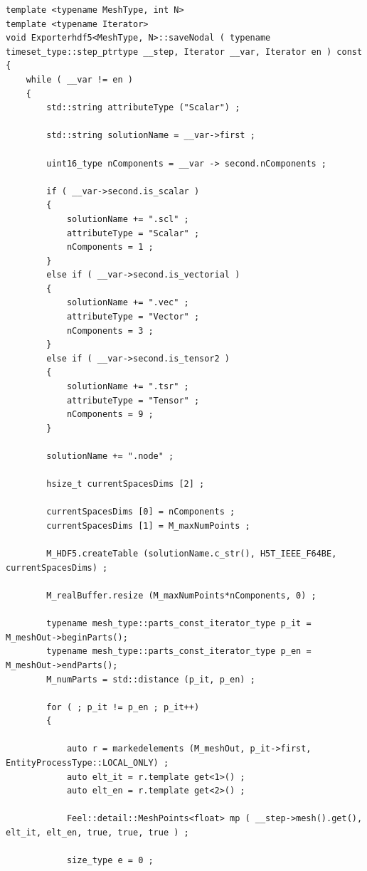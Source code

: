 \documentclass[12pt]{article}
\begin{document}
\begin{lstlisting}
template <typename MeshType, int N>
template <typename Iterator>
void Exporterhdf5<MeshType, N>::saveNodal ( typename timeset_type::step_ptrtype __step, Iterator __var, Iterator en ) const 
{   
    while ( __var != en )
    {    
        std::string attributeType ("Scalar") ;

        std::string solutionName = __var->first ;

        uint16_type nComponents = __var -> second.nComponents ;

        if ( __var->second.is_scalar )
        {
            solutionName += ".scl" ; 
            attributeType = "Scalar" ;
            nComponents = 1 ;
        }
        else if ( __var->second.is_vectorial )
        {
            solutionName += ".vec" ;
            attributeType = "Vector" ;
            nComponents = 3 ;
        }
        else if ( __var->second.is_tensor2 )
        {
            solutionName += ".tsr" ;
            attributeType = "Tensor" ;
            nComponents = 9 ;
        }

        solutionName += ".node" ;

        hsize_t currentSpacesDims [2] ;

        currentSpacesDims [0] = nComponents ;
        currentSpacesDims [1] = M_maxNumPoints ;

        M_HDF5.createTable (solutionName.c_str(), H5T_IEEE_F64BE, currentSpacesDims) ;

        M_realBuffer.resize (M_maxNumPoints*nComponents, 0) ;

        typename mesh_type::parts_const_iterator_type p_it = M_meshOut->beginParts();
        typename mesh_type::parts_const_iterator_type p_en = M_meshOut->endParts();
        M_numParts = std::distance (p_it, p_en) ;

        for ( ; p_it != p_en ; p_it++) 
        {

            auto r = markedelements (M_meshOut, p_it->first, EntityProcessType::LOCAL_ONLY) ;
            auto elt_it = r.template get<1>() ;
            auto elt_en = r.template get<2>() ;

            Feel::detail::MeshPoints<float> mp ( __step->mesh().get(), elt_it, elt_en, true, true, true ) ;

            size_type e = 0 ; 


\end{lstlisting}
\end{document}
